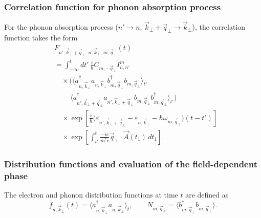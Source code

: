 \documentclass[%
 reprint,
 amsmath,amssymb,
 aps,
]{revtex4-2}
\begin{document}
\subsubsection{Correlation function for phonon absorption process}

For the phonon absorption process
($n' \to n$, $\vec{k}_{\perp}+\vec{q}_{\perp}\to\vec{k}_{\perp}$),
the correlation function takes the form
\begin{equation}
\begin{aligned}
&F_{n',\vec{k}_{\perp}+\vec{q}_{\perp},\,n,\vec{k}_{\perp},\,m,\vec{q}_{\perp}}(t)\\
&=
\int_{-\infty}^{t}
dt'\,
\frac{i}{\hbar}
C_{m,-\vec{q}_{\perp}}
I_{n,n'}^{m}
\\
&\quad\times
\Big(
\langle
a_{n,\vec{k}_{\perp}}^{\dagger}
a_{n,\vec{k}_{\perp}}
b_{m,\vec{q}_{\perp}}^{\dagger}
b_{m,\vec{q}_{\perp}}
\rangle_{t'}
\\
&\quad
-
\langle
a_{n',\vec{k}_{\perp}+\vec{q}_{\perp}}^{\dagger}
a_{n',\vec{k}_{\perp}+\vec{q}_{\perp}}
b_{m,\vec{q}_{\perp}}
b_{m,\vec{q}_{\perp}}^{\dagger}
\rangle_{t'}
\Big)
\\
&\quad\times
\exp\left[
\frac{i}{\hbar}
\big(
\varepsilon_{n',\vec{k}_{\perp}+\vec{q}_{\perp}}
-
\varepsilon_{n,\vec{k}_{\perp}}
-
\hbar\omega_{m,\vec{q}_{\perp}}
\big)
(t-t')
\right]
\\
&\quad\times
\exp\left[
\int_{t'}^{t}
\frac{-ie}{m^{*}c}
\vec{q}_{\perp}
\cdot
\vec{A}(t_{1})
\, dt_{1}
\right].
\end{aligned}
\end{equation}


\subsubsection{Distribution functions and evaluation of the field-dependent phase}

The electron and phonon distribution functions at time $t$ are defined as
\begin{equation}
f_{n,\vec{k}_{\perp}}(t)
=
\langle
a_{n,\vec{k}_{\perp}}^{\dagger}
a_{n,\vec{k}_{\perp}}
\rangle_{t},
\qquad
N_{m,\vec{q}_{\perp}}
=
\langle
b_{m,\vec{q}_{\perp}}^{\dagger}
b_{m,\vec{q}_{\perp}}
\rangle.
\end{equation}
\end{document}
